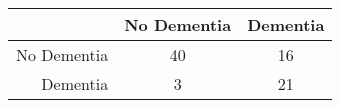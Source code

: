 \begin{table}[ht]
\centering
\begin{tabular}{r|c|c}
  \hline
 & No Dementia & Dementia \\ 
  \hline
No Dementia & 40 & 16 \\ 
  Dementia & 3 & 21 \\ 
   \hline
\end{tabular}
\end{table}
